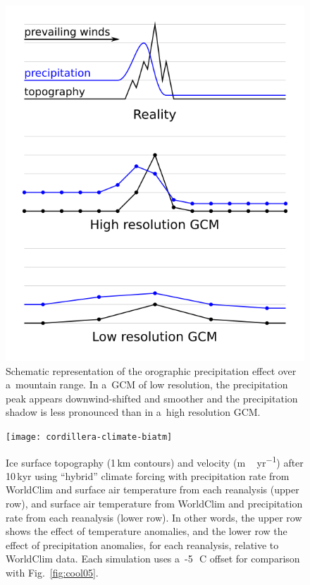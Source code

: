 \documentclass[tc, ms]{copernicus}
\begin{document}
\begin{figure}
  \includegraphics{cordillera-climate-oroprecip}
  \caption{Schematic representation of the orographic precipitation effect over a~mountain range. In a~GCM of low resolution, the precipitation peak appears downwind-shifted and smoother and the precipitation shadow is less pronounced than in a~high resolution GCM.}
  \label{fig:oroprecip}
\end{figure}

\begin{figure}
  \texttt{[image: cordillera-climate-biatm]}
  \caption{Ice surface topography (1\,\unit{km} contours) and velocity (\unit{m\,yr^{-1}}) after 10\,kyr using ``hybrid'' climate forcing with precipitation rate from WorldClim and surface air temperature from each reanalysis (upper row), and surface air temperature from WorldClim and precipitation rate from each reanalysis (lower row). In other words, the upper row shows the effect of temperature anomalies, and the lower row the effect of precipitation anomalies, for each reanalysis, relative to WorldClim data. Each simulation uses a~-5\,\unit{{\degree}C} offset for comparison with Fig.~\ref{fig:cool05}.}
  \label{fig:biatm}
\end{figure}
\end{document}
